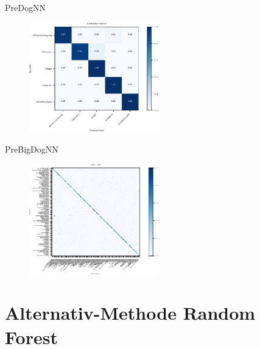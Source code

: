   \begin{frame}{PreDogNN}
    \begin{figure}
      \centering
      \includegraphics[width=0.5\textwidth]{logos/PreDogNN/confusion_matrix_PreDogNN.pdf}
      \label{fig:cm_pre}
    \end{figure}
  \end{frame}

  \begin{frame}{PreBigDogNN}
    \begin{figure}
      \centering
      \includegraphics[width=0.5\textwidth]{logos/PreBigDogNN/confusion_matrix_bigpretrained.pdf}
      \label{fig:cm_prebig}
    \end{figure}
  \end{frame}

  \section{Alternativ-Methode Random Forest}

  \begin{frame}[noframenumbering]
    \tableofcontents[currentsection]
  \end{frame}

